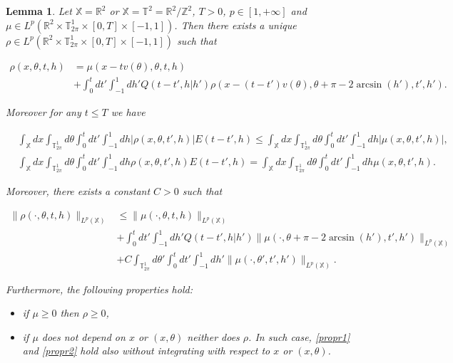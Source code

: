 \documentclass[10pt,a4paper]{amsart}
\newtheorem{lemma}{Lemma}
\begin{document}
\begin{lemma}\label{lemma:rho}
Let $\mathbb{X}=\mathbb{R}^2$ or $\mathbb{X}=\mathbb{T}^2=\mathbb{R}^2/\mathbb{Z}^2$, $T>0$, $p\in[1,+\infty]$ and $\mu\in L^p(\mathbb{R}^2\times\mathbb{T}^1_{2\pi}\times[0,T]\times[-1,1])$. Then there exists a unique $\rho\in L^p(\mathbb{R}^2\times\mathbb{T}^1_{2\pi}\times[0,T]\times[-1,1])$ such that

{\small\begin{align}
\nonumber\rho(x,\theta,t,h)&=\mu(x-tv(\theta),\theta,t,h)
\\
\label{proprho}&+\int_0^tdt'\int_{-1}^1dh'Q(t-t',h|h')\rho(x-(t-t')v(\theta),\theta+\pi-2\arcsin(h'),t',h').
\end{align}}

Moreover for any $t\leq T$ we have

{\footnotesize\begin{align}
\label{propr1}&\int_{\mathbb{X}}dx\int_{\mathbb{T}^1_{2\pi}}d\theta \int_0^tdt'\int_{-1}^1dh|\rho(x,\theta,t',h)|E(t-t',h)\leq \int_{\mathbb{X}}dx\int_{\mathbb{T}^1_{2\pi}}d\theta \int_0^tdt'\int_{-1}^1dh|\mu(x,\theta,t',h)|,
\\
\label{propr2}&\int_{\mathbb{X}}dx\int_{\mathbb{T}^1_{2\pi}}d\theta \int_0^tdt'\int_{-1}^1dh\rho(x,\theta,t',h)E(t-t',h)=\int_{\mathbb{X}}dx\int_{\mathbb{T}^1_{2\pi}}d\theta \int_0^tdt'\int_{-1}^1dh\mu(x,\theta,t',h).
\end{align}}

Moreover, there exists a constant $C>0$ such that

\begin{align}
\nonumber\|\rho(\cdot,\theta,t,h)\|_{L^p(\mathbb{X})}&\leq\|\mu(\cdot,\theta,t,h)\|_{L^p(\mathbb{X})}
\\
\nonumber&+\int_0^tdt'\int_{-1}^1dh'Q(t-t',h|h')\|\mu(\cdot,\theta+\pi-2\arcsin(h'),t',h')\|_{L^p(\mathbb{X})}
\\
\label{normaLprho}&+C\int_{\mathbb{T}^1_{2\pi}}d\theta'\int_0^tdt'\int_{-1}^1dh'\|\mu(\cdot,\theta',t',h')\|_{L^p(\mathbb{X})}.
\end{align}

Furthermore, the following properties hold:
\begin{itemize}
\item if $\mu\geq0$ then $\rho\geq0$,
\item if $\mu$ does not depend on $x$ or $(x,\theta)$ neither does $\rho$. In such case, \eqref{propr1} and \eqref{propr2} hold also without integrating with respect to $x$ or $(x,\theta)$.
\end{itemize}
\end{lemma}
\end{document}
